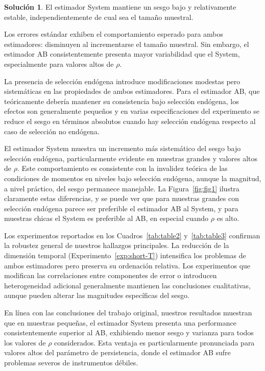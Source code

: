 \documentclass[12pt,letterpaper,reqno,oneside]{amsart}
\theoremstyle{problemstyle} %
\theoremstyle{definition} %
\newtheorem{solution}{Solución}[problem]
\begin{document}
\begin{solution}
  El estimador System mantiene un sesgo bajo y relativamente estable, independientemente de cual sea el tamaño muestral.

  Los errores estándar exhiben el comportamiento esperado para ambos estimadores: disminuyen al incrementarse el tamaño muestral.
  Sin embargo, el estimador AB consistentemente presenta mayor variabilidad que el System, especialmente para valores altos de $\rho$.

  La presencia de selección endógena introduce modificaciones modestas pero sistemáticas en las propiedades de ambos estimadores.
  Para el estimador AB, que teóricamente debería mantener su consistencia bajo selección endógena, los efectos son generalmente pequeños y en varias especificaciones del experimento se reduce el sesgo en términos absolutos cuando hay selección endógena respecto al caso de selección no endógena.

  El estimador System muestra un incremento más sistemático del sesgo bajo selección endógena, particularmente evidente en muestras grandes y valores altos de $\rho$.
  Este comportamiento es consistente con la invalidez teórica de las condiciones de momentos en niveles bajo selección endógena, aunque la magnitud, a nivel práctico, del sesgo permanece manejable.
  La Figura~\ref{fig:fig1} ilustra claramente estas diferencias, y se puede ver que para muestras grandes con selección endógena parece ser preferible el estimador AB al System, y para muestras chicas el System es preferible al AB, en especial cuando $\rho$ es alto.

  Los experimentos reportados en los Cuadros~\ref{tab:table2} y~\ref{tab:table3} confirman la robustez general de nuestros hallazgos principales.
  La reducción de la dimensión temporal (Experimento~\ref{exp:short-T}) intensifica los problemas de ambos estimadores pero preserva su ordenación relativa.
  Los experimentos que modifican las correlaciones entre componentes de error o introducen heterogeneidad adicional generalmente mantienen las conclusiones cualitativas, aunque pueden alterar las magnitudes específicas del sesgo.

  En línea con las conclusiones del trabajo original, nuestros resultados muestran que en muestras pequeñas, el estimador System presenta una performance consistentemente superior al AB, exhibiendo menor sesgo y varianza para todos los valores de $\rho$ considerados.
  Esta ventaja es particularmente pronunciada para valores altos del parámetro de persistencia, donde el estimador AB sufre problemas severos de instrumentos débiles.


\end{solution}
\end{document}
